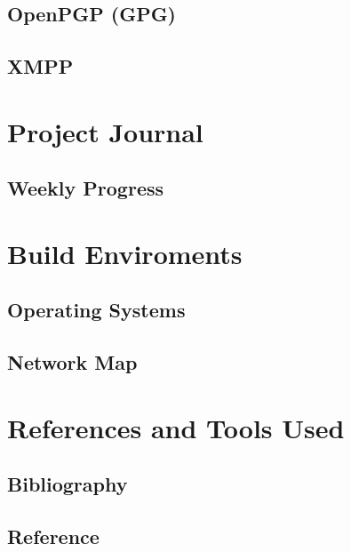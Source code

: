 \documentclass[a4paper,12pt]{report}
\begin{document}


\section{OpenPGP (GPG)}



\section{XMPP}


\chapter{Project Journal}

\label{chap:journal}

\section{Weekly Progress}

\label{sec:progress}

\chapter{Build Enviroments}

\section{Operating Systems}



\section{Network Map}




\chapter{References and Tools Used}

\section{Bibliography}

\section{Reference}
\end{document}
